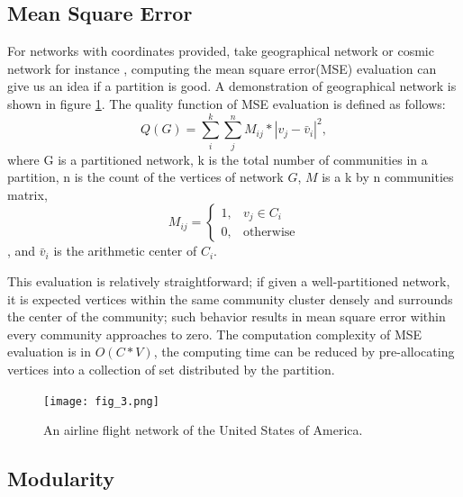 \documentclass[12pt]{article}
\begin{document}
\subsection{Mean Square Error}
For networks with coordinates provided, take geographical network or cosmic network for instance \cite{9,10}, computing the mean square error(MSE) evaluation can give us an idea if a partition is good. A demonstration of geographical network is shown in figure \ref{fig:fig_3}. The quality function of MSE evaluation is defined as follows:
    $$Q(G) = \sum_{i}^{k}\sum_{j}^{n} M_{i j} * |v_{j} - \bar{v}_{i}|^{2},$$
where G is a partitioned network, k is the total number of communities in a partition, n is the count of the vertices of network $G$, $M$ is a k by n communities matrix, \[
  M_{ij} = 
  \begin{cases}
    1, &  v_{j} \in C_i\\
    0, & \text{otherwise}
  \end{cases}
\]
, and $\bar{v}_{i}$ is the arithmetic center of $C_i$. 

\bigbreak

This evaluation is relatively straightforward; if given a well-partitioned network, it is expected vertices within the same community cluster densely and surrounds the center of the community; such behavior results in mean square error within every community approaches to zero. The computation complexity of MSE evaluation is in $O(C*V)$, the computing time can be reduced by pre-allocating vertices into a collection of set distributed by the partition.

\begin{figure}
\centering
\texttt{[image: fig\_3.png]}

\caption{\label{fig:fig_3}An airline flight network of the United States of America\cite{11}.}
\end{figure}

\subsection{Modularity}
\end{document}
